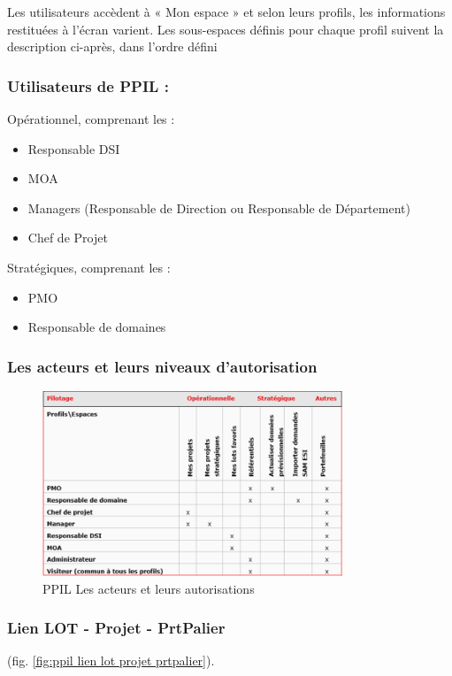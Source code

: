 Les utilisateurs accèdent à « Mon espace » et selon leurs profils, les informations restituées à l’écran varient. Les sous-espaces définis pour chaque profil suivent la description ci-après, dans l’ordre défini 

\subsubsection{Utilisateurs de PPIL :}
Opérationnel, comprenant les : 
\begin{itemize}
    \item Responsable DSI
    \item MOA
    \item Managers (Responsable de Direction ou Responsable de Département) 
    \item Chef de Projet
\end{itemize}
Stratégiques, comprenant les :
\begin{itemize}
    \item PMO
    \item Responsable de domaines
\end{itemize}

\subsubsection{Les acteurs et leurs niveaux d'autorisation}
\begin{figure}[!h]
\centering
\includegraphics[width=0.8\textwidth]{images/ppil acteurs.png}
\caption{PPIL Les acteurs et leurs autorisations}
\end{figure}

\subsubsection{Lien LOT - Projet - PrtPalier}

(fig. \ref{fig:ppil lien lot projet prtpalier}).

